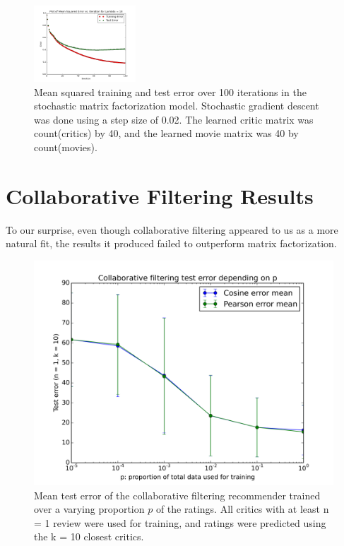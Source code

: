 \documentclass[12pt]{article}
\newcommand{\plotwidth}{0.34}
\begin{document}
\begin{figure}[H]
	\includegraphics[width=\plotwidth\textwidth]{../plots/matrix/test-i100d40l10.png}
	\caption{Mean squared training and test error over 100 iterations in the stochastic matrix factorization model. Stochastic gradient descent was done using a step size of 0.02. The learned critic matrix was count(critics) by 40, and the learned movie matrix was 40 by count(movies).}
	\label{fig:40}
	\end{figure}

\section{Collaborative Filtering Results}

To our surprise, even though collaborative filtering appeared to us as a more
natural fit, the results it produced failed to outperform matrix factorization.

\begin{figure}[H]
\centering
\includegraphics[width=\textwidth]{../plots/collab/graph_p.png}
\caption{Mean test error of the collaborative filtering recommender trained
    over a varying proportion $p$ of the ratings. All critics with at least
    n = 1 review were used for training, and ratings were predicted using the
    k = 10 closest critics.}
\label{fig:collab_p}
\end{figure}
\end{document}
